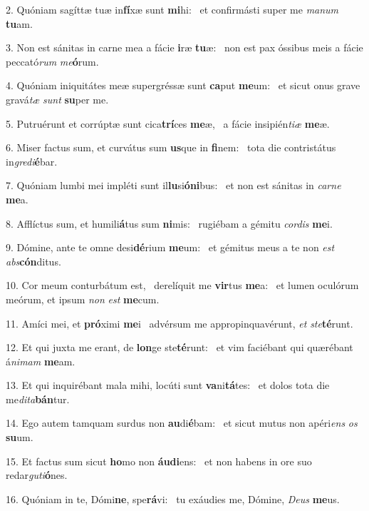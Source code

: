 2. Quóniam sagíttæ tuæ in\textbf{fí}xæ sunt \textbf{mi}hi: \ast\  et confirmásti super me \textit{ma}\textit{num} \textbf{tu}am.\

3. Non est sánitas in carne mea a fácie \textbf{i}ræ \textbf{tu}æ: \ast\  non est pax óssibus meis a fácie peccató\textit{rum} \textit{me}\textbf{ó}rum.\

4. Quóniam iniquitátes meæ supergréssæ sunt \textbf{ca}put \textbf{me}um: \ast\  et sicut onus grave gravá\textit{tæ} \textit{sunt} \textbf{su}per me.\

5. Putruérunt et corrúptæ sunt cica\textbf{trí}ces \textbf{me}æ, \ast\  a fácie insipién\textit{ti}\textit{æ} \textbf{me}æ.\

6. Miser factus sum, et curvátus sum \textbf{us}que in \textbf{fi}nem: \ast\  tota die contristátus in\textit{gre}\textit{di}\textbf{é}bar.\

7. Quóniam lumbi mei impléti sunt il\textbf{lu}si\textbf{ó}\textbf{ni}bus: \ast\  et non est sánitas in \textit{car}\textit{ne} \textbf{me}a.\

8. Afflíctus sum, et humili\textbf{á}tus sum \textbf{ni}mis: \ast\  rugiébam a gémitu \textit{cor}\textit{dis} \textbf{me}i.\

9. Dómine, ante te omne desi\textbf{dé}rium \textbf{me}um: \ast\  et gémitus meus a te non \textit{est} \textit{abs}\textbf{cón}ditus.\

10. Cor meum conturbátum est, \dag\  derelíquit me \textbf{vir}tus \textbf{me}a: \ast\  et lumen oculórum meórum, et ipsum \textit{non} \textit{est} \textbf{me}cum.\

11. Amíci mei, et \textbf{pró}ximi \textbf{me}i \ast\  advérsum me appropinquavérunt, \textit{et} \textit{ste}\textbf{té}runt.\

12. Et qui juxta me erant, de \textbf{lon}ge ste\textbf{té}runt: \ast\  et vim faciébant qui quærébant á\textit{ni}\textit{mam} \textbf{me}am.\

13. Et qui inquirébant mala mihi, locúti sunt \textbf{va}ni\textbf{tá}tes: \ast\  et dolos tota die me\textit{di}\textit{ta}\textbf{bán}tur.\

14. Ego autem tamquam surdus non \textbf{au}di\textbf{é}bam: \ast\  et sicut mutus non apéri\textit{ens} \textit{os} \textbf{su}um.\

15. Et factus sum sicut \textbf{ho}mo non \textbf{áu}\textbf{di}ens: \ast\  et non habens in ore suo redar\textit{gu}\textit{ti}\textbf{ó}nes.\

16. Quóniam in te, Dómi\textbf{ne}, spe\textbf{rá}vi: \ast\  tu exáudies me, Dómine, \textit{De}\textit{us} \textbf{me}us.\


